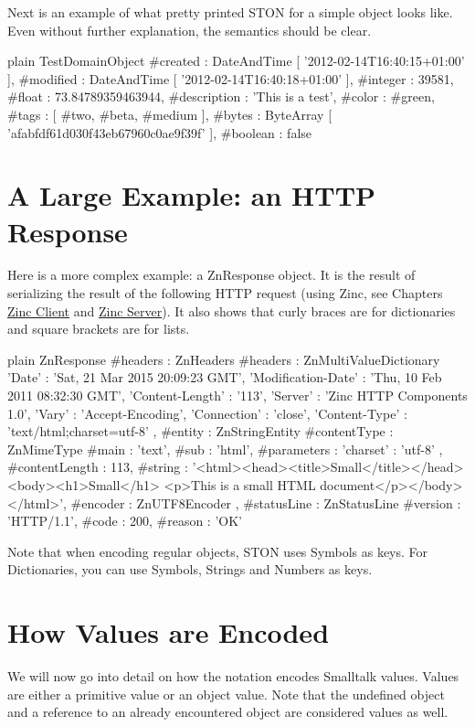 \documentclass[10pt,twoside,english]{_support/latex/sbabook/sbabook}
\begin{document}
Next is an example of what pretty printed STON for a simple object looks like.
Even without further explanation, the semantics should be clear.

\begin{displaycode}{plain}
TestDomainObject {
   #created : DateAndTime [ '2012-02-14T16:40:15+01:00' ],
   #modified : DateAndTime [ '2012-02-14T16:40:18+01:00' ],
   #integer : 39581,
   #float : 73.84789359463944,
   #description : 'This is a test',
   #color : #green,
   #tags : [
      #two,
      #beta,
      #medium
   ],
   #bytes : ByteArray [ 'afabfdf61d030f43eb67960c0ae9f39f' ],
   #boolean : false
 }
\end{displaycode}
\section{A Large Example: an HTTP Response}
Here is a more complex example:  a ZnResponse object. It is the result of serializing the result of the following HTTP request (using Zinc, see
Chapters \hyperref[cha:zinc-client]{Zinc Client} and \hyperref[cha:zinc-server]{Zinc Server}). It also shows that curly
braces are for dictionaries and square brackets are for lists.

\begin{displaycode}{plain}
ZnResponse {
   #headers : ZnHeaders {
      #headers : ZnMultiValueDictionary {
         'Date' : 'Sat, 21 Mar 2015 20:09:23 GMT',
         'Modification-Date' : 'Thu, 10 Feb 2011 08:32:30 GMT',
         'Content-Length' : '113',
         'Server' : 'Zinc HTTP Components 1.0',
         'Vary' : 'Accept-Encoding',
         'Connection' : 'close',
         'Content-Type' : 'text/html;charset=utf-8'
      }
   },
   #entity : ZnStringEntity {
      #contentType : ZnMimeType {
         #main : 'text',
         #sub : 'html',
         #parameters : {
            'charset' : 'utf-8'
         }
      },
      #contentLength : 113,
      #string :
'<html>\n<head><title>Small</title></head>\n<body><h1>Small</h1>
<p>This is a small HTML document</p></body>\n</html>\n',
      #encoder : ZnUTF8Encoder { }
   },
   #statusLine : ZnStatusLine {
      #version : 'HTTP/1.1',
      #code : 200,
      #reason : 'OK'
   }
}
\end{displaycode}

Note that when encoding regular objects, STON uses Symbols as keys.
For Dictionaries, you can use Symbols, Strings and Numbers as keys.
\section{How Values are Encoded}
We will now go into detail on how the notation encodes Smalltalk values. Values are either a primitive value or an object value. Note that the undefined object
 and a reference to an already encountered object are considered values as well.
\end{document}
